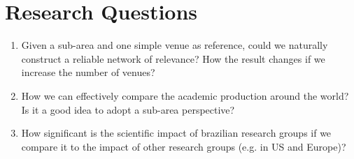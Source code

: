 \documentclass[a4paper,12pt,titlepage]{article}
\begin{document}
\section{Research Questions} 

\begin{enumerate}
\item Given a sub-area and one simple venue as reference, could we naturally construct a reliable network of relevance? How the result changes if we increase the number of venues?
\item How we can effectively compare the academic production around the world? Is it a good idea to adopt a sub-area perspective?
\item How significant is the scientific impact of brazilian research groups if we compare it to the impact of other research groups (e.g. in US and Europe)?
\end{enumerate}
\end{document}
